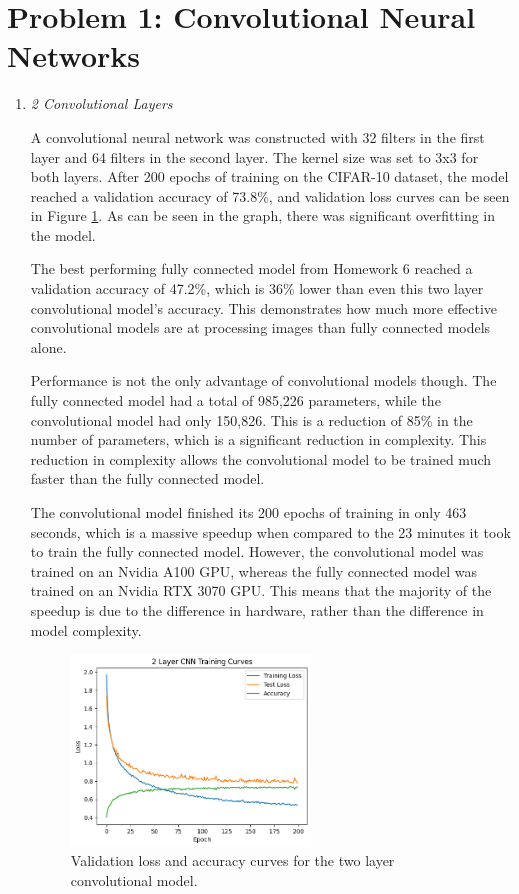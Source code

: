 \documentclass{article}
\begin{document}


\section{Problem 1: Convolutional Neural Networks}
\begin{enumerate}[label=\alph*. ]
    \item \textit{2 Convolutional Layers}

     A convolutional neural network was constructed with 32 filters in the first layer and 64 filters in the second layer. The kernel size was set to 3x3 for both layers. After 200 epochs of training on the CIFAR-10 dataset, the model reached a validation accuracy of 73.8\%, and validation loss curves can be seen in Figure \ref{fig:conv_loss_a}. As can be seen in the graph, there was significant overfitting in the model.
     
     The best performing fully connected model from Homework 6 reached a validation accuracy of 47.2\%, which is 36\% lower than even this two layer convolutional model's accuracy. This demonstrates how much more effective convolutional models are at processing images than fully connected models alone. 
     
     Performance is not the only advantage of convolutional models though. The fully connected model had a total of 985,226 parameters, while the convolutional model had only 150,826. This is a reduction of 85\% in the number of parameters, which is a significant reduction in complexity. This reduction in complexity allows the convolutional model to be trained much faster than the fully connected model. 
     
     The convolutional model finished its 200 epochs of training in only 463 seconds, which is a massive speedup when compared to the 23 minutes it took to train the fully connected model. However, the convolutional model was trained on an Nvidia A100 GPU, whereas the fully connected model was trained on an Nvidia RTX 3070 GPU. This means that the majority of the speedup is due to the difference in hardware, rather than the difference in model complexity.

     \begin{figure}[ht]
        \centering
        \includegraphics[width=0.6\textwidth]{output/graph1_a.png}
        \caption{Validation loss and accuracy curves for the two layer convolutional model.}
        \label{fig:conv_loss_a}
    \end{figure}
     

\end{enumerate}
\end{document}
